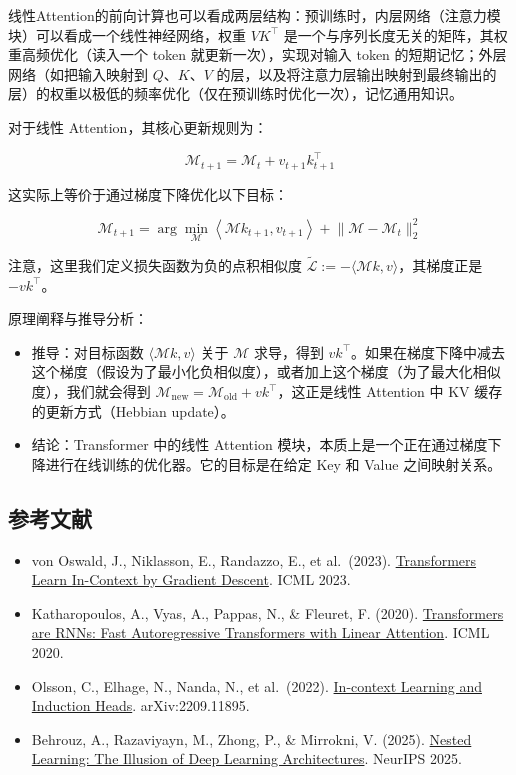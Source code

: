 线性Attention的前向计算也可以看成两层结构：预训练时，内层网络（注意力模块）可以看成一个线性神经网络，权重 \(VK^\top\) 是一个与序列长度无关的矩阵，其权重高频优化（读入一个 token 就更新一次），实现对输入 token 的短期记忆；外层网络（如把输入映射到 \(Q\)、\(K\)、\(V\) 的层，以及将注意力层输出映射到最终输出的层）的权重以极低的频率优化（仅在预训练时优化一次），记忆通用知识。

对于线性 Attention，其核心更新规则为：

\[
\mathcal{M}_{t+1}=\mathcal{M}_t+v_{t+1}k_{t+1}^\top
\tag{16}
\]

这实际上等价于通过梯度下降优化以下目标：

\[
\mathcal{M}_{t+1}=\arg\min_{\mathcal{M}}\left\langle \mathcal{M}k_{t+1},v_{t+1}\right\rangle+\lVert \mathcal{M}-\mathcal{M}_t\rVert_2^2
\tag{15}
\]

注意，这里我们定义损失函数为负的点积相似度 \(\tilde{\mathcal{L}}:=-\langle \mathcal{M}k,v\rangle\)，其梯度正是 \(-vk^\top\)。

原理阐释与推导分析：

\begin{itemize}
\tightlist
\item
  推导：对目标函数 \(\langle \mathcal{M}k,v\rangle\) 关于 \(\mathcal{M}\) 求导，得到 \(vk^\top\)。如果在梯度下降中减去这个梯度（假设为了最小化负相似度），或者加上这个梯度（为了最大化相似度），我们就会得到 \(\mathcal{M}_{\mathrm{new}}=\mathcal{M}_{\mathrm{old}}+vk^\top\)，这正是线性 Attention 中 KV 缓存的更新方式（Hebbian update）。
\item
  结论：Transformer 中的线性 Attention 模块，本质上是一个正在通过梯度下降进行在线训练的优化器。它的目标是在给定 Key 和 Value 之间映射关系。
\end{itemize}

\FloatBarrier
{}
\hypertarget{ux53c2ux8003ux6587ux732e-72}{%
\subsection{参考文献}\label{ux53c2ux8003ux6587ux732e-72}}

\vspace{0.25em}
\begin{itemize}
\tightlist
\item
  von Oswald, J., Niklasson, E., Randazzo, E., et al.~(2023). \href{https://arxiv.org/abs/2212.07677}{Transformers Learn In-Context by Gradient Descent}. ICML 2023.
\item
  Katharopoulos, A., Vyas, A., Pappas, N., \& Fleuret, F. (2020). \href{https://arxiv.org/abs/2006.16236}{Transformers are RNNs: Fast Autoregressive Transformers with Linear Attention}. ICML 2020.
\item
  Olsson, C., Elhage, N., Nanda, N., et al.~(2022). \href{https://arxiv.org/abs/2209.11895}{In-context Learning and Induction Heads}. arXiv:2209.11895.
\item
  Behrouz, A., Razaviyayn, M., Zhong, P., \& Mirrokni, V. (2025). \href{https://arxiv.org/abs/2512.24695}{Nested Learning: The Illusion of Deep Learning Architectures}. NeurIPS 2025.
\end{itemize}

\clearpage
